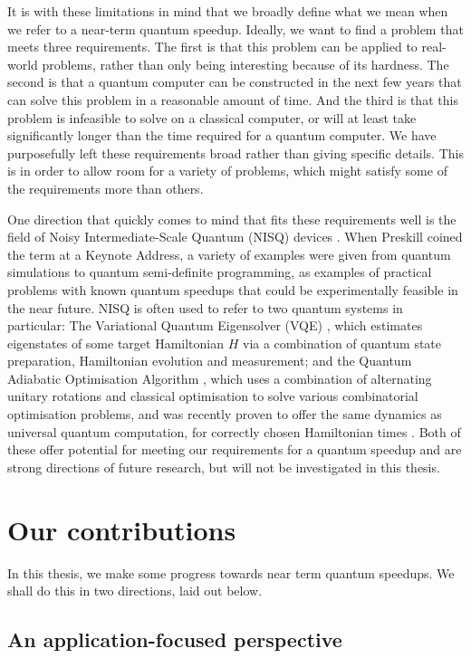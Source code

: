It is with these limitations in mind that we broadly define what we mean when we refer to a near-term quantum speedup. Ideally, we want to find a problem that meets three requirements. The first is that this problem can be applied to real-world problems, rather than only being interesting because of its hardness. The second is that a quantum computer can be constructed in the next few years that can solve this problem in a reasonable amount of time. And the third is that this problem is infeasible to solve on a classical computer, or will at least take significantly longer than the time required for a quantum computer. We have purposefully left these requirements broad rather than giving specific details. This is in order to allow room for a variety of problems, which might satisfy some of the requirements more than others.

One direction that quickly comes to mind that fits these requirements well is the field of Noisy Intermediate-Scale Quantum (NISQ) devices \cite{preskill2018}. When Preskill coined the term at a Keynote Address, a variety of examples were given from quantum simulations to quantum semi-definite programming, as examples of practical problems with known quantum speedups that could be experimentally feasible in the near future. NISQ is often used to refer to two quantum systems in particular: The Variational Quantum Eigensolver (VQE) \cite{peruzzo2014}, which estimates eigenstates of some target Hamiltonian $H$ via a combination of quantum state preparation, Hamiltonian evolution and measurement; and the Quantum Adiabatic Optimisation Algorithm \cite{farhi2014}, which uses a combination of alternating unitary rotations and classical optimisation to solve various combinatorial optimisation problems, and was recently proven to offer the same dynamics as universal quantum computation, for correctly chosen Hamiltonian times \cite{lloyd2018, morales2019}. Both of these offer potential for meeting our requirements for a quantum speedup and are strong directions of future research, but will not be investigated in this thesis.

\section{Our contributions}
\label{sec:contributions}

In this thesis, we make some progress towards near term quantum speedups. We shall do this in two directions, laid out below.

\subsection{An application-focused perspective}

